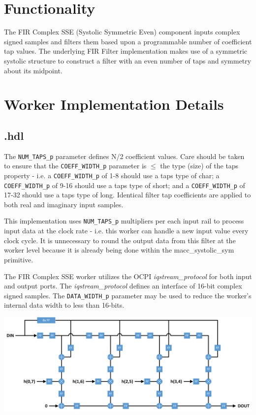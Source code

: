 \section*{Functionality}
\begin{flushleft}
	The FIR Complex SSE (Systolic Symmetric Even) component inputs complex signed samples and filters them based upon a programmable number of coefficient tap values. The underlying FIR Filter implementation makes use of a symmetric systolic structure to construct a filter with an even number of taps and symmetry about its midpoint.
\end{flushleft}

\section*{Worker Implementation Details}
\subsection*{\comp.hdl}
\begin{flushleft}
	The \verb+NUM_TAPS_p+ parameter defines N/2 coefficient values. Care should be taken to ensure that the \verb+COEFF_WIDTH_p+ parameter is $\le$ the type (size) of the taps property - i.e. a \verb+COEFF_WIDTH_p+ of 1-8 should use a taps type of char; a \verb+COEFF_WIDTH_p+ of 9-16 should use a taps type of short; and a \verb+COEFF_WIDTH_p+ of 17-32 should use a taps type of long. Identical filter tap coefficients are applied to both real and imaginary input samples.\medskip

	This implementation uses \verb+NUM_TAPS_p+ multipliers per each input rail to process input data at the clock rate - i.e. this worker can handle a new input value every clock cycle. It is unnecessary to round the output data from this filter at the worker level because it is already being done within the macc\_systolic\_sym primitive.\medskip

	The FIR Complex SSE worker utilizes the OCPI \textit{iqstream\_protocol} for both input and output ports. The \textit{iqstream\_protocol} defines an interface of 16-bit complex signed samples. The \verb+DATA_WIDTH_p+ parameter may be used to reduce the worker's internal data width to less than 16-bits.
\end{flushleft}
{\centering\captionsetup{type=figure}\includegraphics[scale=0.65]{fir_systolic_sym_even}\par{}\label{fig:circuit}}

